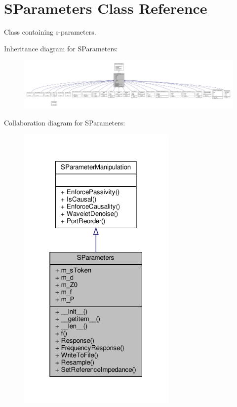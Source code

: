 \hypertarget{classSignalIntegrity_1_1SParameters_1_1SParameters_1_1SParameters}{}\section{S\+Parameters Class Reference}
\label{classSignalIntegrity_1_1SParameters_1_1SParameters_1_1SParameters}


Class containing s-\/parameters.  




Inheritance diagram for S\+Parameters\+:\nopagebreak
\begin{figure}[H]
\begin{center}
\leavevmode
\includegraphics[width=350pt]{classSignalIntegrity_1_1SParameters_1_1SParameters_1_1SParameters__inherit__graph}
\end{center}
\end{figure}


Collaboration diagram for S\+Parameters\+:\nopagebreak
\begin{figure}[H]
\begin{center}
\leavevmode
\includegraphics[width=220pt]{classSignalIntegrity_1_1SParameters_1_1SParameters_1_1SParameters__coll__graph}
\end{center}
\end{figure}
